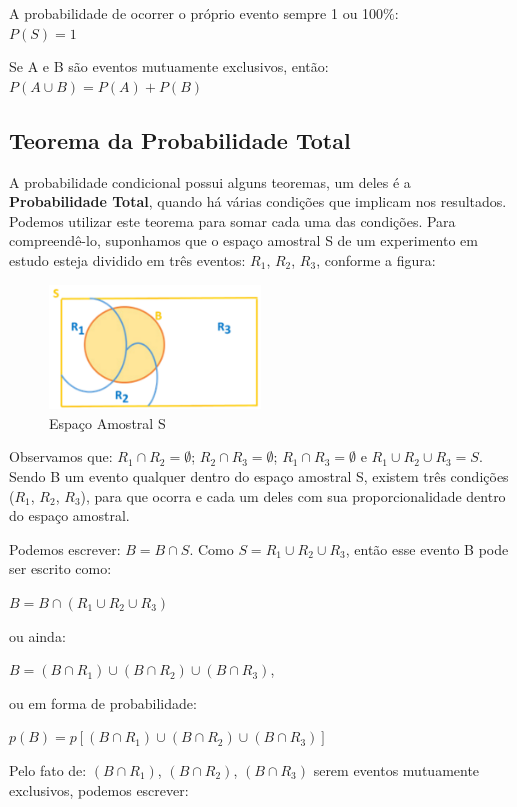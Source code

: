 \documentclass[a4paper,11pt]{article}
\begin{document}
A probabilidade de ocorrer o próprio evento sempre 1 ou 100\%: \\
$P(S) = 1$

Se A e B são eventos mutuamente exclusivos, então: \\
$P(A \cup B) = P(A) + P(B)$

\subsection{Teorema da Probabilidade Total}
A probabilidade condicional possui alguns teoremas, um deles é a \textbf{Probabilidade Total}, quando há várias condições que implicam nos resultados. Podemos utilizar este teorema para somar cada uma das condições. Para compreendê-lo, suponhamos que o espaço amostral S de um experimento em estudo esteja dividido em três eventos: $R_1$, $R_2$, $R_3$, conforme a figura:

\begin{figure}[H]
	\centering
	\includegraphics[width=0.5\textwidth]{imagens/espacoAmostral.png}
	\caption{Espaço Amostral S}
\end{figure}

Observamos que: $R_1 \cap R_2 = \emptyset$; $R_2 \cap R_3 = \emptyset$; $R_1 \cap R_3 = \emptyset$ e $R_1 \cup R_2 \cup R_3 = S$. Sendo B um evento qualquer dentro do espaço amostral S, existem três condições ($R_1$, $R_2$, $R_3$), para que ocorra e cada um deles com sua proporcionalidade dentro do espaço amostral. 

Podemos escrever: $B = B \cap S$. Como $S = R_1 \cup R_2 \cup R_3$, então esse evento B pode ser escrito como: 

$B = B \cap (R_1 \cup R_2 \cup R_3)$ 

ou ainda: 

$B = (B \cap R_1) \cup (B \cap R_2) \cup (B \cap R_3)$, 

ou em forma de probabilidade: 

$p(B) = p[(B \cap R_1) \cup (B \cap R_2) \cup (B \cap R_3)]$

Pelo fato de: $(B \cap R_1)$, $(B \cap R_2)$, $(B \cap R_3)$ serem eventos mutuamente exclusivos, podemos escrever: 
\end{document}
